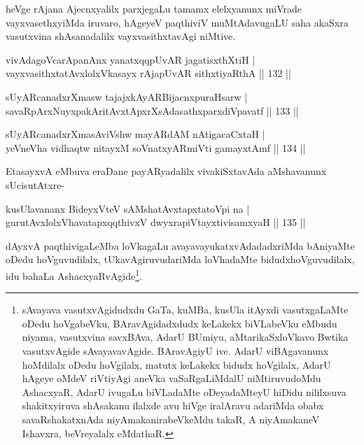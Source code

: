 \begin{artha}
heVge rAjana Ajecnxyalilx parxjegaLu tamamx elelxyanunx miVrade vayxvasethxyiMda iruvaro, hAgeyeV paqthiviV muMtAdavugaLU saha akaSxra vasutxvina shAsanadalilx vayxvasithxtavAgi niMtive.
\end{artha}


\begin{shl}
vivAdagoVcarApanAnx yanatxqqpUvAR jagatisxthXtiH |\\
vayxvasithxtatAvxlolxVkasayx rAjapUvAR sithxtiyaRthA \hfill || 132 ||
\end{shl}

\begin{shl}
sUyARcanadxrXmasw tajajxkAyARBijacnxpuraHsarw |\\
savaRpArxNuyxpakAritAvxtApxrXsAdasathxparxdiVpavatf \hfill || 133 ||
\end{shl}

\begin{shl}
sUyARcanadxrXmasAviVshw mayARdAM nAtigacaCxtaH |\\
yeVneVha vidhaqtw nitayxM soV\s natxyARmiVti gamayxtAmf \hfill || 134 ||
\end{shl}

\begin{artha}
EtasayxvA eMbuva eraDane payARyadalilx vivakiSxtavAda aMshavanunx sUcisutAtxre-
\end{artha}

\begin{shl}
kusUlavananx BideyxVteV sAMshatAvxtapxtatoV\s pi na |\\
gurutAvxlolxVhavatapxqqthivxV dwyxrapiVtayxtivisamxyaH \hfill || 135 ||
\end{shl}

\begin{artha}%
dAyxvA paqthivigaLeMba loVkagaLu avayavayukatxvAdadadxriMda bAniyaMte oDedu hoVguvudilalx, tUkavAgiruvudariMda loVhadaMte bidudxhoVguvudilalx, idu bahaLa AshacxyaRvAgide\footnote[1]{sAvayava vasutxvAgidudxdu GaTa, kuMBa, kusUla itAyxdi vasutxgaLaMte oDedu hoVgabeVku, BAravAgidadxdudx keLakekx biVLabeVku eMbudu niyama, vasutxvina savxBAva, AdarU BUmiyu, aMtarikaSxloVkavo Bwtika vasutxvAgide sAvayavavAgide. BAravAgiyU ive. AdarU viBAgavanunx hoMdilalx oDedu hoVgilalx, matutx keLakekx bidudx hoVgilalx, AdarU hAgeye oMdeV riVtiyAgi aneVka vaSaRgaLiMdalU niMtiruvudoMdu AshacxyaR, AdarU ivugaLu biVLadaMte oDeyadaMteyU hiDidu nililxsuva shakitxyiruva shAsakanu ilalxde avu hiVge iralAravu adariMda obabx savaRshakatxnAda niyAmakanirabeVkeMdu takaR, A niyAmakaneV Ishavxra, beVreyalalx eMdathaR.}.
\end{artha}

